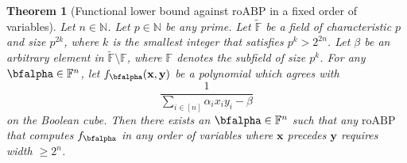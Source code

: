 \documentclass[11pt]{article}
\newtheorem{theorem}{Theorem}[section]
\newtheorem{remark}[theorem]{Remark}
\newcommand{\poly}{\mathop{\mathrm{poly}}}
\newcommand{\F}{\mathbb{F}}
\newcommand{\comment}[2]{\marginpar{\tiny{\textbf{#1: }\textit{#2}}}}
\newcommand{\nl}[1]{\comment{NL}{#1}}
\newcommand{\vr}[1]{\comment{VR}{#1}}
\newcommand{\IPSLINp}{\mathrm{IPS}_{\mathrm{LIN}'}}
\newcommand{\roABP}{\mathrm{roABP}}
\begin{document}
\begin{theorem}[Functional lower bound against $\roABP$ in a fixed order of variables]\label{thm:roabp-lbd-fixed-order-positive-char}
    Let $n\in \mathbb{N}$. Let $p\in \mathbb{N}$ be any prime. Let $\tilde{\F}$ be a field of characteristic $p$ and size $p^{2k}$, where $k$ is the smallest integer that satisfies $p^k > 2^{2n}$. Let $\beta$ be an arbitrary element in $\tilde{\F}\setminus\F$, where $\F$ denotes the subfield of size $p^k$. For any $\bfalpha \in \F^{n}$, let $f_{\bfalpha}(\mathbf{x},\mathbf{y})$ be a polynomial which agrees with $$\frac{1}{\sum_{i \in [n]}\alpha_{i}x_iy_i - \beta}$$ on the Boolean cube. Then there exists an $\bfalpha \in \F^{n}$ such that any $\roABP$ that computes $f_{\bfalpha}$ in any order of variables where $\mathbf{x}$ precedes $\mathbf{y}$ requires width $\geq 2^n$. 
\end{theorem}

\end{document}
